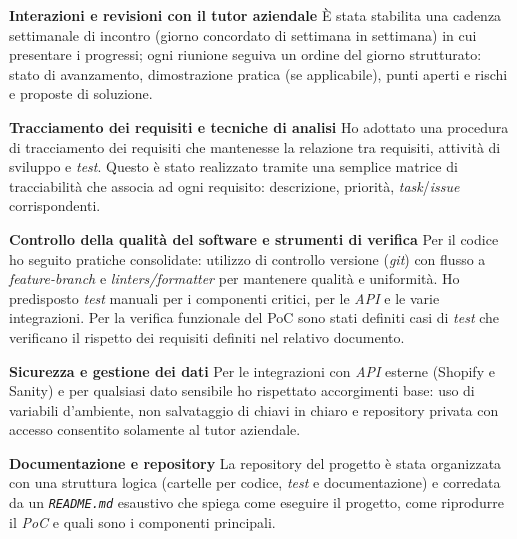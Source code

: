 \medskip
\noindent\textbf{Interazioni e revisioni con il tutor aziendale}
È stata stabilita una cadenza settimanale di incontro (giorno concordato di settimana in settimana) in cui presentare i progressi; 
ogni riunione seguiva un ordine del giorno strutturato: stato di avanzamento, dimostrazione pratica (se applicabile), punti aperti e rischi e proposte di soluzione.

\medskip
\noindent\textbf{Tracciamento dei requisiti e tecniche di analisi}
Ho adottato una procedura di tracciamento dei requisiti che mantenesse la relazione tra requisiti, attività di sviluppo e \emph{test}. 
Questo è stato realizzato tramite una semplice matrice di tracciabilità che associa ad ogni requisito: descrizione, priorità, \emph{task}/\emph{issue} corrispondenti.

\medskip
\noindent\textbf{Controllo della qualità del software e strumenti di verifica}
Per il codice ho seguito pratiche consolidate: utilizzo di controllo versione 
(\emph{git}) con flusso a \emph{feature-branch} e \emph{linters/formatter} per mantenere qualità e uniformità. 
Ho predisposto \emph{test} manuali per i componenti critici, per le \emph{API} e le varie integrazioni. 
Per la verifica funzionale del PoC sono stati definiti casi di \emph{test} che verificano il rispetto dei requisiti definiti nel relativo documento.

\medskip
\noindent\textbf{Sicurezza e gestione dei dati}
Per le integrazioni con \emph{API} esterne (Shopify e Sanity) e per qualsiasi dato sensibile ho rispettato accorgimenti base: 
uso di variabili d'ambiente, non salvataggio di chiavi in chiaro e repository privata con accesso consentito solamente al tutor aziendale.

\medskip
\noindent\textbf{Documentazione e repository}
La repository del progetto è stata organizzata con una struttura logica (cartelle per codice, \emph{test} e documentazione) 
e corredata da un \texttt{\emph{README.md}} esaustivo che spiega come eseguire il progetto, come riprodurre il \emph{PoC} e quali sono i componenti principali.





